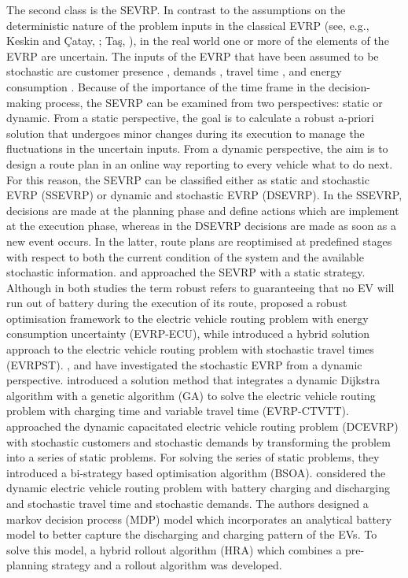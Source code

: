 \documentclass[11pt]{article}
\begin{document}
The second class is the SEVRP. In contrast to the assumptions on the deterministic nature of the problem inputs in the classical EVRP (see, e.g., Keskin and \c{C}atay, \citeyear{Keskin2016}; Ta\c{s}, \citeyear{Tas2020}), in the real world one or more of the elements of the EVRP are uncertain. The inputs of the EVRP that have been assumed to be stochastic are customer presence \citep{Shi2019}, demands \citep{Lu2019}, travel time \citep{Shao2017, Bi2019, Reyes2019}, and energy consumption \citep{Pelletier2019}. Because of the importance of the time frame in the decision-making process, the SEVRP can be examined from two perspectives: static or dynamic. From a static perspective, the goal is to calculate a robust a-priori solution that undergoes minor changes during its execution to manage the fluctuations in the uncertain inputs. From a dynamic perspective, the aim is to design a route plan in an online way reporting to every vehicle what to do next. For this reason, the SEVRP can be classified either as static and stochastic EVRP (SSEVRP) or dynamic and stochastic EVRP (DSEVRP). In the SSEVRP, decisions are made at the planning phase and define actions which are implement at the execution phase, whereas in the DSEVRP decisions are made as soon as a new event occurs. In the latter, route plans are reoptimised at predefined stages with respect to both the current condition of the system and the available stochastic information. \cite{Pelletier2019} and \cite{Reyes2019} approached the SEVRP with a static strategy. Although in both studies the term robust refers to guaranteeing that no EV will run out of battery during the execution of its route, \cite{Pelletier2019} proposed a robust optimisation framework to the electric vehicle routing problem with energy consumption uncertainty (EVRP-ECU), while \cite{Reyes2019} introduced a hybrid solution approach to the electric vehicle routing problem with stochastic travel times (EVRPST). \cite{Shao2017}, \cite{Lu2019} and \cite{Bi2019} have investigated the stochastic EVRP from a dynamic perspective. \cite{Shao2017} introduced a solution method that integrates a dynamic Dijkstra algorithm with a genetic algorithm (GA) to solve the electric vehicle routing problem with charging time and variable travel time (EVRP-CTVTT). \cite{Lu2019} approached the dynamic capacitated electric vehicle routing problem (DCEVRP) with stochastic customers and stochastic demands by transforming the problem into a series of static problems. For solving the series of static problems, they introduced a bi-strategy based optimisation algorithm (BSOA). \cite{Bi2019} considered the dynamic electric vehicle routing problem with battery charging and discharging and stochastic travel time and stochastic demands. The authors designed a markov decision process (MDP) model which incorporates an analytical battery model to better capture the discharging and charging pattern of the EVs. To solve this model, a hybrid rollout algorithm (HRA) which combines a pre-planning strategy and a rollout algorithm was developed.
\end{document}
